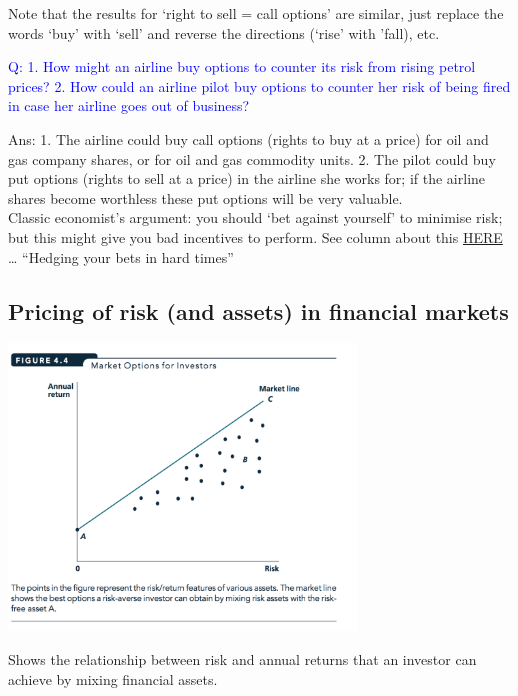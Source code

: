 \documentclass[]{article}
\providecommand{\tightlist}{%
  \setlength{\itemsep}{0pt}\setlength{\parskip}{0pt}}
\begin{document}
Note that the results for `right to sell = call options' are similar,
just replace the words `buy' with `sell' and reverse the directions
(`rise' with 'fall), etc.

\textcolor{blue}{Q: 1. How might an airline buy options to counter its risk from rising petrol prices? 2. How could an airline pilot buy options to counter her risk of being fired in case her airline goes out of business?}

Ans: 1. The airline could buy call options (rights to buy at a price)
for oil and gas company shares, or for oil and gas commodity units. 2.
The pilot could buy put options (rights to sell at a price) in the
airline she works for; if the airline shares become worthless these put
options will be very valuable.\\
Classic economist's argument: you should `bet against yourself' to
minimise risk; but this might give you bad incentives to perform. See
column about this
\href{http://www.marketplace.org/2008/08/11/business/hedging-your-bets-hard-times}{HERE}
\ldots{} ``Hedging your bets in hard times''

\hypertarget{pricing-of-risk-and-assets-in-financial-markets}{%
\subsection{Pricing of risk (and assets) in financial
markets}\label{pricing-of-risk-and-assets-in-financial-markets}}

\includegraphics[height=3in]{picsfigs/marketriskline.png}

\begin{description}
\tightlist
\item[Market line]
Shows the relationship between risk and annual returns that an investor
can achieve by mixing financial assets.
\end{description}
\end{document}
